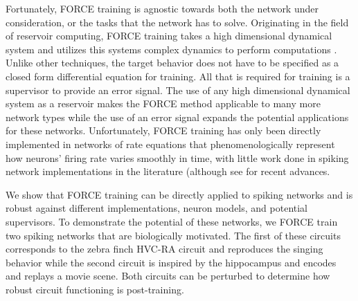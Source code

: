 \documentclass[11pt]{article} %
\begin{document}
Fortunately, FORCE training is agnostic towards both the network under consideration, or the tasks that the network has to solve.  Originating in the field of reservoir computing, FORCE training takes a high dimensional dynamical system and utilizes this systems complex dynamics to perform computations \cite{FORCE1,RCreview1,RCreview2,RCreview3,dominey1,maass1,jaeger4,PSM,chaoticreservoir1,maass2,maass3,HHLSM,B2}.  Unlike other techniques, the target behavior does not have to be specified as a closed form differential equation for training.  All that is required for training is a supervisor to provide an error signal.  The use of any high dimensional dynamical system as a reservoir makes the FORCE method applicable to many more network types while the use of an error signal expands the potential applications for these networks.  Unfortunately, FORCE training has only been directly implemented in networks of rate equations that phenomenologically represent how neurons' firing rate varies smoothly in time, with little work done in spiking network implementations in the literature (although see \cite{FORCE2,FORCE4} for recent advances. 


We show that FORCE training can be directly applied to spiking networks and is robust against different implementations, neuron models, and potential supervisors.  To demonstrate the potential of these networks, we FORCE train two spiking networks that are biologically motivated.  The first of these circuits corresponds to the zebra finch HVC-RA circuit and reproduces the singing behavior while the second circuit is inspired by the hippocampus and encodes and replays a movie scene.  Both circuits can be perturbed to determine how robust circuit functioning is post-training.  
\end{document}
